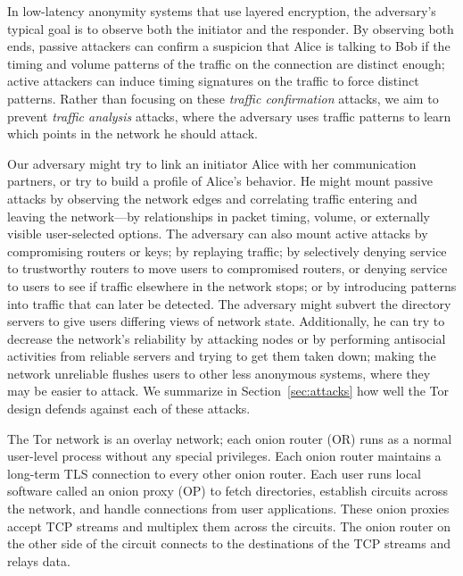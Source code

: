 \documentclass[times,10pt,twocolumn]{article}
\begin{document}
In low-latency anonymity systems that use layered encryption, the
adversary's typical goal is to observe both the initiator and the
responder. By observing both ends, passive attackers can confirm a
suspicion that Alice is 
talking to Bob if the timing and volume patterns of the traffic on the
connection are distinct enough; active attackers can induce timing
signatures on the traffic to force distinct patterns. Rather
than focusing on these \emph{traffic confirmation} attacks,
we aim to prevent \emph{traffic
analysis} attacks, where the adversary uses traffic patterns to learn
which points in the network he should attack.

Our adversary might try to link an initiator Alice with her
communication partners, or try to build a profile of Alice's
behavior. He might mount passive attacks by observing the network edges
and correlating traffic entering and leaving the network---by
relationships in packet timing, volume, or externally visible
user-selected
options. The adversary can also mount active attacks by compromising
routers or keys; by replaying traffic; by selectively denying service
to trustworthy routers to move users to
compromised routers, or denying service to users to see if traffic
elsewhere in the
network stops; or by introducing patterns into traffic that can later be
detected. The adversary might subvert the directory servers to give users
differing views of network state. Additionally, he can try to decrease
the network's reliability by attacking nodes or by performing antisocial
activities from reliable servers and trying to get them taken down;
making the network unreliable flushes users to other less anonymous
systems, where they may be easier to attack.
We summarize
in Section~\ref{sec:attacks} how well the Tor design defends against
each of these attacks.


\label{sec:design}

The Tor network is an overlay network; each onion router (OR) 
runs as a normal
user-level process without any special privileges.
Each onion router maintains a long-term TLS \cite{TLS}
connection to every other onion router.
Each user
runs local software called an onion proxy (OP) to fetch directories,
establish circuits across the network,
and handle connections from user applications.  These onion proxies accept
TCP streams and multiplex them across the circuits. The onion
router on the other side 
of the circuit connects to the destinations of
the TCP streams and relays data.
\end{document}
